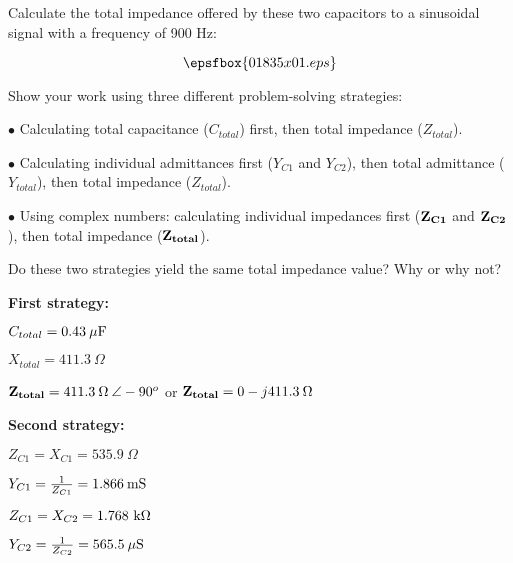

Calculate the total impedance offered by these two capacitors to a sinusoidal signal with a frequency of 900 Hz:

$$\epsfbox{01835x01.eps}$$

Show your work using three different problem-solving strategies:

\medskip
\item{$\bullet$} Calculating total capacitance ($C_{total}$) first, then total impedance ($Z_{total}$).
\item{$\bullet$} Calculating individual admittances first ($Y_{C1}$ and $Y_{C2}$), then total admittance ($Y_{total}$), then total impedance ($Z_{total}$).
\item{$\bullet$} Using complex numbers: calculating individual impedances first (${\bf Z_{C1}}$ and ${\bf Z_{C2}}$), then total impedance (${\bf Z_{total}}$).
\medskip

Do these two strategies yield the same total impedance value?  Why or why not?







\noindent
{\bf First strategy:}

$C_{total} = 0.43 \> \mu \hbox{F}$

$X_{total} = 411.3 \> \Omega$

${\bf Z_{total}} = 411.3 \> \Omega \> \angle -90^o$ or ${\bf Z_{total}} = 0 - j411.3 \> \Omega$

\vskip 10pt

\goodbreak

\noindent
{\bf Second strategy:}

$Z_{C1} = X_{C1} = 535.9 \> \Omega$

\vskip 5pt

$Y_{C1} = {1 \over Z_{C1}} = 1.866 \> \hbox{mS}$

\vskip 5pt

$Z_{C1} = X_{C2} = 1.768 \hbox{ k}\Omega$

\vskip 5pt

$Y_{C2} = {1 \over Z_{C2}} = 565.5 \> \mu \hbox{S}$

\vskip 5pt

